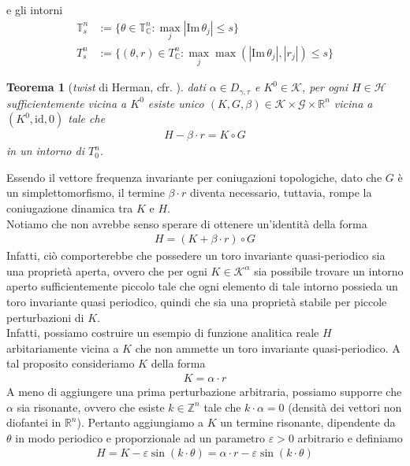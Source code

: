 \documentclass[twoside, 11pt]{amsbook}
\newcommand{\0}{{(0)}}
\newcommand{\3}{{(3)}}
\theoremstyle{colonplain}
\newtheorem{thm}{Teorema}[chapter]
\theoremstyle{colondefinition}
\theoremstyle{colonremark}
\numberwithin{equation}{chapter}
\begin{document}
e gli intorni
\begin{align}
    \mathbb{T}^n_s &:= \{\theta \in \mathbb{T}^n_\mathbb{C} : \max_j |\mathrm{Im} \, \theta_j| \leq s\} \\
    T^n_s &:= \{ (\theta, r) \in T^n_\mathbb{C} : \max_j \max(|\mathrm{Im} \, \theta_j|, |r_j|) \leq s\}
\end{align}
\begin{thm}[\textit{twist} di Herman, cfr. \cite{Massetti}]\label{TwistThmHerman1} dati $\alpha \in D_{\gamma, \tau}$ e $K^0 \in \mathcal{K}$, per ogni $H \in \mathcal{H}$ sufficientemente vicina a $K^0$ esiste unico $(K, G, \beta) \in \mathcal{K} \times \mathcal{G} \times \mathbb{R}^n$ vicina a $(K^0, \mathrm{id}, 0)$ tale che
\begin{align}\label{TwistNormalForm}
    H - \beta \cdot r = K \circ G 
\end{align}
in un intorno di $T^n_0$.
\end{thm}
Essendo il vettore frequenza invariante per coniugazioni topologiche, dato che $G$ è un simplettomorfismo, il termine $\beta \cdot r$ diventa necessario, tuttavia, rompe la coniugazione dinamica tra $K$ e $H$. \\
Notiamo che non avrebbe senso sperare di ottenere un'identità della forma
\begin{align}
    H = (K + \beta \cdot r) \circ G
\end{align}
Infatti, ciò comporterebbe che possedere un toro invariante quasi-periodico sia una proprietà aperta, ovvero che per ogni $K \in \mathcal{K}^\alpha$ sia possibile trovare un intorno aperto sufficientemente piccolo tale che ogni elemento di tale intorno possieda un toro invariante quasi periodico, quindi che sia una proprietà stabile per piccole perturbazioni di $K$. \\
Infatti, possiamo costruire un esempio di funzione analitica reale $H$ arbitariamente vicina a $K$ che non ammette un toro invariante quasi-periodico. A tal proposito consideriamo $K$ della forma
\begin{align}
    K = \alpha \cdot r
\end{align}
A meno di aggiungere una prima perturbazione arbitraria, possiamo supporre che $\alpha$ sia risonante, ovvero che esiste $k \in \mathbb{Z}^n$ tale che $k \cdot \alpha = 0$ (densità dei vettori non diofantei in $\mathbb{R}^n$). Pertanto aggiungiamo a $K$ un termine risonante, dipendente da $\theta$ in modo periodico e proporzionale ad un parametro $\varepsilon > 0$ arbitrario e definiamo
\begin{align}
    H = K - \varepsilon\sin(k \cdot \theta) = \alpha \cdot r - \varepsilon\sin(k \cdot \theta)
\end{align}
\end{document}

